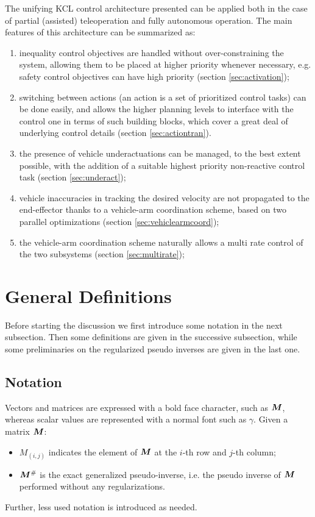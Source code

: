 The unifying KCL control architecture presented can be applied both in the case of partial (assisted) teleoperation and fully autonomous operation. The main features of this architecture can be summarized as:
\begin{enumerate}[label={$\bm{F_{\arabic*}}$}]%
	\item inequality control objectives are handled without over-constraining the system, allowing them to be placed at higher priority whenever necessary, e.g. safety control objectives can have high priority (section \ref{sec:activation});
	\item switching between actions (an action is a set of prioritized control tasks) can be done easily, and allows the higher planning levels to interface with the control one in terms of such building blocks, which cover a great deal of underlying control details (section \ref{sec:actiontran}).
	\item the presence of vehicle underactuations can be managed, to the best extent possible, with the addition of a suitable highest priority non-reactive control task (section \ref{sec:underact});
	\item vehicle inaccuracies in tracking the desired velocity are not propagated to the end-effector thanks to a vehicle-arm coordination scheme, based on two parallel optimizations (section \ref{sec:vehiclearmcoord});
	\item the vehicle-arm coordination scheme naturally allows a multi rate control of the two subsystems (section \ref{sec:multirate});  
\end{enumerate}

\section{General Definitions}\label{sec:definitions}

Before starting the discussion we first introduce some notation in the next subsection. Then some definitions are given in the successive subsection, while some preliminaries on the regularized pseudo inverses are given in the last one.
\subsection{Notation}
Vectors and matrices are expressed with a bold face character, such as $\bm{M}$, whereas scalar values are represented with a normal font such as $\gamma$.
Given a matrix $\bm{M}$:
\begin{itemize}
	\item $M_{(i,j)}$ indicates the element of $\bm{M}$ at the $i$-th row and $j$-th column;
	\item $\bm{M}^\#$ is the exact generalized pseudo-inverse, i.e. the pseudo inverse of $\bm{M}$ performed without any regularizations.
\end{itemize}
Further, less used notation is introduced as needed.

